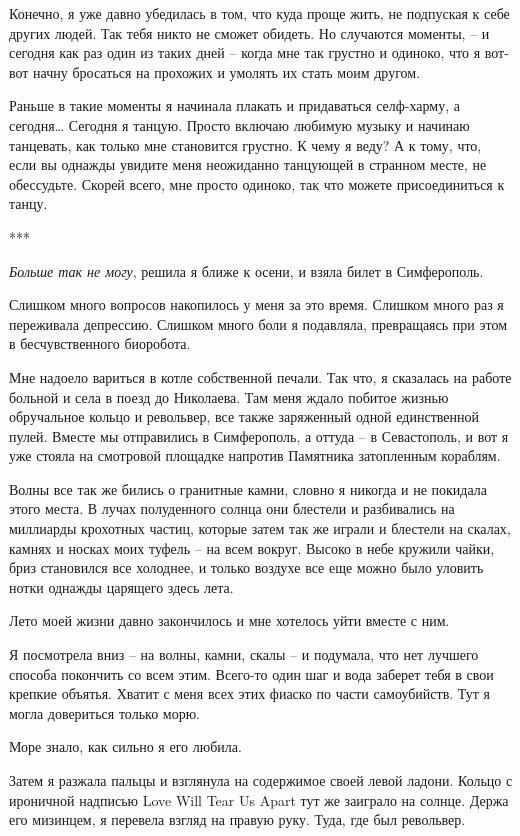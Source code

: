 \documentclass[
]{book}
\begin{document}
Конечно, я уже давно убедилась в том, что куда проще жить, не подпуская к себе других людей. Так тебя никто не сможет обидеть. Но случаются моменты, -- и сегодня как раз один из таких дней -- когда мне так грустно и одиноко, что я вот-вот начну бросаться на прохожих и умолять их стать моим другом.

Раньше в такие моменты я начинала плакать и придаваться селф-харму, а сегодня\ldots{} Сегодня я танцую. Просто включаю любимую музыку и начинаю танцевать, как только мне становится грустно. К чему я веду? А к тому, что, если вы однажды увидите меня неожиданно танцующей в странном месте, не обессудьте. Скорей всего, мне просто одиноко, так что можете присоединиться к танцу.

***

\emph{Больше так не могу}, решила я ближе к осени, и взяла билет в Симферополь.

Слишком много вопросов накопилось у меня за это время. Слишком много раз я переживала депрессию. Слишком много боли я подавляла, превращаясь при этом в бесчувственного биоробота.

Мне надоело вариться в котле собственной печали. Так что, я сказалась на работе больной и села в поезд до Николаева. Там меня ждало побитое жизнью обручальное кольцо и револьвер, все также заряженный одной единственной пулей. Вместе мы отправились в Симферополь, а оттуда -- в Севастополь, и вот я уже стояла на смотровой площадке напротив Памятника затопленным кораблям.

Волны все так же бились о гранитные камни, словно я никогда и не покидала этого места. В лучах полуденного солнца они блестели и разбивались на миллиарды крохотных частиц, которые затем так же играли и блестели на скалах, камнях и носках моих туфель -- на всем вокруг. Высоко в небе кружили чайки, бриз становился все холоднее, и только воздухе все еще можно было уловить нотки однажды царящего здесь лета.

Лето моей жизни давно закончилось и мне хотелось уйти вместе с ним.

Я посмотрела вниз -- на волны, камни, скалы -- и подумала, что нет лучшего способа покончить со всем этим. Всего-то один шаг и вода заберет тебя в свои крепкие объятья. Хватит с меня всех этих фиаско по части самоубийств. Тут я могла довериться только морю.

Море знало, как сильно я его любила.

Затем я разжала пальцы и взглянула на содержимое своей левой ладони. Кольцо с ироничной надписью Love Will Tear Us Apart тут же заиграло на солнце. Держа его мизинцем, я перевела взгляд на правую руку. Туда, где был револьвер.
\end{document}
